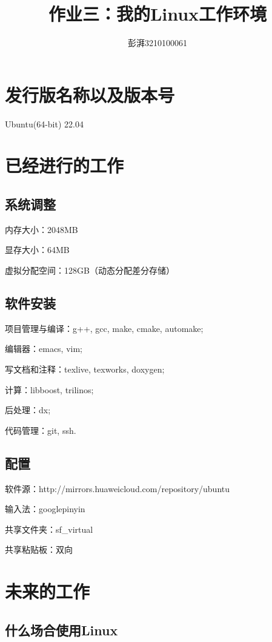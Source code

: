 \documentclass{ctexart}
\title{作业三：我的Linux工作环境}
\author{彭湃3210100061}
\begin{document}
\maketitle

\section{发行版名称以及版本号}

Ubuntu(64-bit) 22.04

\section{已经进行的工作}

\subsection{系统调整}

内存大小：2048MB

显存大小：64MB

虚拟分配空间：128GB（动态分配差分存储）

\subsection{软件安装}

项目管理与编译：g++, gcc, make, cmake, automake;

编辑器：emacs, vim;

写文档和注释：texlive, texworks, doxygen;

计算：libboost, trilinos;

后处理：dx;

代码管理：git, ssh.

\subsection{配置}

软件源：http://mirrors.huaweicloud.com/repository/ubuntu

输入法：googlepinyin

共享文件夹：sf\_virtual

共享粘贴板：双向

\section{未来的工作}

\subsection{什么场合使用Linux}
\end{document}

